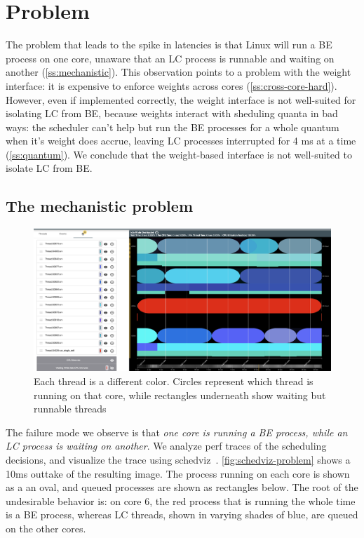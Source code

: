 \section{Problem}\label{s:problem}

The problem that leads to the spike in latencies is that Linux will run a BE
process on one core, unaware that an LC process is runnable and waiting on
another (\autoref{ss:mechanistic}). This observation points to a problem with
the \cgroups{} weight interface: it is expensive to enforce weights across cores
(\autoref{ss:cross-core-hard}). However, even if implemented correctly, the
\cgroups{} weight interface is not well-suited for isolating LC from BE, because
weights interact with sheduling quanta in bad ways: the scheduler can't help but
run the BE processes for a whole quantum when it's weight does accrue, leaving
LC processes interrupted for 4 ms at a time (\autoref{ss:quantum}). We conclude
that the weight-based interface is not well-suited to isolate LC from BE.

\subsection{The mechanistic problem}\label{ss:mechanistic}

\begin{figure}[t]
    \centering
    \includegraphics[width=\columnwidth]{graphs/schedviz-problem.png}
    \caption{Each thread is a different color. Circles represent which
    thread is running on that core, while rectangles underneath show waiting but
    runnable threads
    }\label{fig:schedviz-problem}
\end{figure}

The failure mode we observe is that \textit{one core is running a BE process,
while an LC process is waiting on another}. We analyze perf traces of the
scheduling decisions, and visualize the trace using schedviz~\cite{TODO}.
\autoref{fig:schedviz-problem} shows a 10ms outtake of the resulting image. The
process running on each core is shown as a an oval, and queued processes are
shown as rectangles below. The root of the undesirable behavior is: on core 6,
the red process that is running the whole time is a BE process, whereas LC
threads, shown in varying shades of blue, are queued on the other cores.

